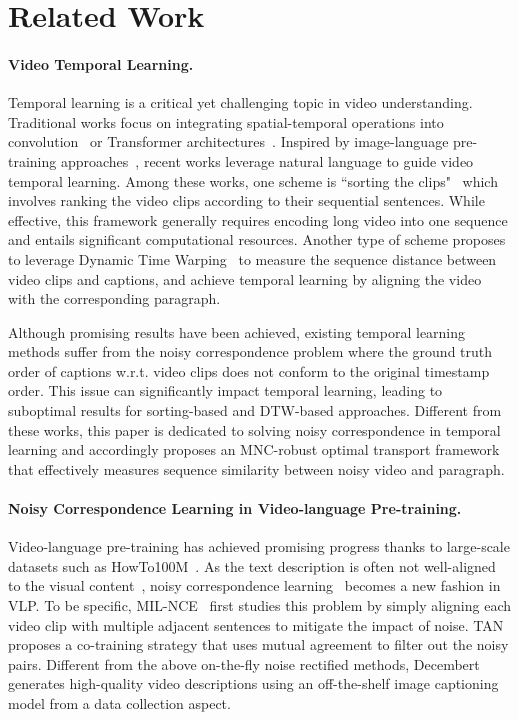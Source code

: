 \section{Related Work}

\paragraph{Video Temporal Learning.} 
Temporal learning is a critical yet challenging topic in video understanding. Traditional works focus on integrating spatial-temporal operations into convolution~\citep{feichtenhofer2019slowfast} or Transformer architectures~\citep{bertasius2021space,wang2022all,sun2022long}. Inspired by image-language pre-training approaches~\citep{clip,align}, recent works leverage natural language to guide video temporal learning. Among these works, one scheme is ``sorting the clips"~\citep{merlot,zeng2023tvtsv2,zeng2022learning,ma2023temporal} which involves ranking the video clips according to their sequential sentences. While effective, this framework generally requires encoding long video into one sequence and entails significant computational resources. Another type of scheme proposes to leverage Dynamic Time Warping~\citep{tempclr, muller2007dynamic,dropdtw} to measure the sequence distance between video clips and captions, and achieve temporal learning by aligning the video with the corresponding paragraph. 

Although promising results have been achieved, existing temporal learning methods suffer from the noisy correspondence problem where the ground truth order of captions w.r.t. video clips does not conform to the original timestamp order. This issue can significantly impact temporal learning, leading to suboptimal results for sorting-based and DTW-based approaches. 
Different from these works, this paper is dedicated to solving noisy correspondence in temporal learning and accordingly proposes an MNC-robust optimal transport framework that effectively measures sequence similarity between noisy video and paragraph.

\paragraph{Noisy Correspondence Learning in Video-language Pre-training.} Video-language pre-training has achieved promising progress thanks to large-scale datasets such as HowTo100M~\citep{howto100m}. As the text description is often not well-aligned to the visual content~\citep{tan}, noisy correspondence learning~\citep{huang2021learning,gao2021clip2tv} becomes a new fashion in VLP. To be specific, MIL-NCE~\citep{milnce} first studies this problem by simply aligning each video clip with multiple adjacent sentences to mitigate the impact of noise.
TAN~\citep{tan} proposes a co-training strategy that uses mutual agreement to filter out the noisy pairs. Different from the above on-the-fly noise rectified methods, Decembert~\citep{decembert} generates high-quality video descriptions using an off-the-shelf image captioning model from a data collection aspect.

